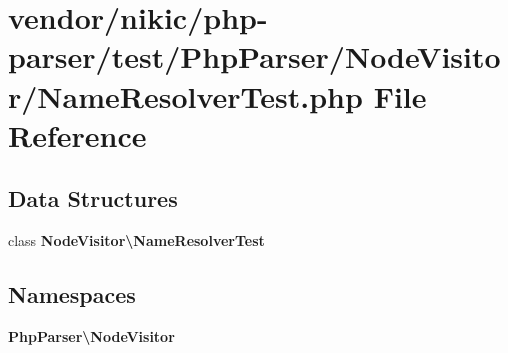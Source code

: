 \section{vendor/nikic/php-\/parser/test/\+Php\+Parser/\+Node\+Visitor/\+Name\+Resolver\+Test.php File Reference}
\label{_name_resolver_test_8php}
\subsection*{Data Structures}
\begin{DoxyCompactItemize}
\item 
class {\bf Node\+Visitor\textbackslash{}\+Name\+Resolver\+Test}
\end{DoxyCompactItemize}
\subsection*{Namespaces}
\begin{DoxyCompactItemize}
\item 
 {\bf Php\+Parser\textbackslash{}\+Node\+Visitor}
\end{DoxyCompactItemize}

